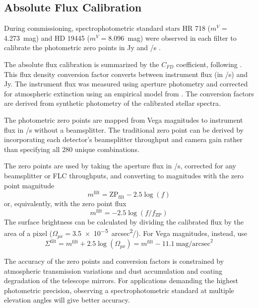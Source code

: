 \subsection{Absolute Flux Calibration}

During commissioning, spectrophotometric standard stars HR 718 ($m^V=$\SI{4.273}{mag}) and HD 19445 ($m^V=$\SI{8.096}{mag}) were observed in each filter to calibrate the photometric zero points in \si{Jy} and \si{\electron/\second} \citep{hamuy_southern_1992,hamuy_southern_1994,stone_spectrophotometry_1996,zacharias_fourth_2013}.

The absolute flux calibration is summarized by the $C_{FD}$ coefficient, following \citet{gordon_james_2022}. This flux density conversion factor converts between instrument flux (in \si{\electron/\second}) and \si{Jy}. The instrument flux was measured using aperture photometry and corrected for atmospheric extinction using an empirical model from  \citet{buton_atmospheric_2013}. The conversion factors are derived from synthetic photometry of the calibrated stellar spectra.

The photometric zero points are mapped from Vega magnitudes to instrument flux in \si{\electron/\second} without a beamsplitter. The traditional zero point can be derived by incorporating each detector's beamsplitter throughput and camera gain rather than specifying all \num{280} unique combinations.

The zero points are used by taking the aperture flux in \si{\electron/\second}, corrected for any beamsplitter or FLC throughputs, and converting to magnitudes with the zero point magnitude
\begin{equation}
    m^\mathrm{filt}=\mathrm{ZP}_\mathrm{filt} - 2.5\log{\left(f\right)}
\end{equation}
or, equivalently, with the zero point flux
\begin{equation}
    m^\mathrm{filt}=-2.5\log{\left(f/f_\mathrm{ZP}\right)}
\end{equation}
The surface brightness can be calculated by dividing the calibrated flux by the area of a pixel ($\Omega_{px}=$\SI{3.5e-5}{arcsec^2/\pixel}). For Vega magnitudes, instead, use
\begin{equation}
    \label{eqn:surf_bright}
    \Sigma^\mathrm{filt} = m^\mathrm{filt} + 2.5\log{\left(\Omega_{px}\right)} = m^\mathrm{filt} - 11.1~\mathrm{mag/arcsec}^2
\end{equation}

The accuracy of the zero points and conversion factors is constrained by atmospheric transmission variations and dust accumulation and coating degradation of the telescope mirrors. For applications demanding the highest photometric precision, observing a spectrophotometric standard at multiple elevation angles will give better accuracy.

